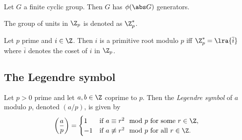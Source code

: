 \documentclass{article}
\begin{document}
\begin{corollary}
	Let $G$ a finite cyclic group. Then $G$ has $\phi(\abs G)$ generators.
\end{corollary}

\begin{definition}
	The group of units in $\Z_p$ is denoted as $\Z_p^*$.
\end{definition}

\begin{theorem}
	Let $p$ prime and $i\in\Z$. Then $i$ is a primitive root modulo $p$ iff
	$\Z_p^*=\lra{\overline i}$ where $\overline i$ denotes the coset of $i$ in
	$\Z_p$.
\end{theorem}

\subsection{The Legendre symbol}

\begin{definition}
	Let $p>0$ prime and let $a,b\in\Z$ coprime to $p$.
	Then the \emph{Legendre symbol} of $a$ modulo $p$, denoted $(a/p)$, is given by
	\begin{align*}
		\left(\frac{a}{p}\right)=\begin{cases}
			1  & \text{if }a\equiv r^2\mod p\text{ for some $r\in\Z$},    \\
			-1 & \text{if }a\not\equiv r^2\mod p\text{ for all $r\in\Z$}.
		\end{cases}
	\end{align*}
\end{definition}
\end{document}
